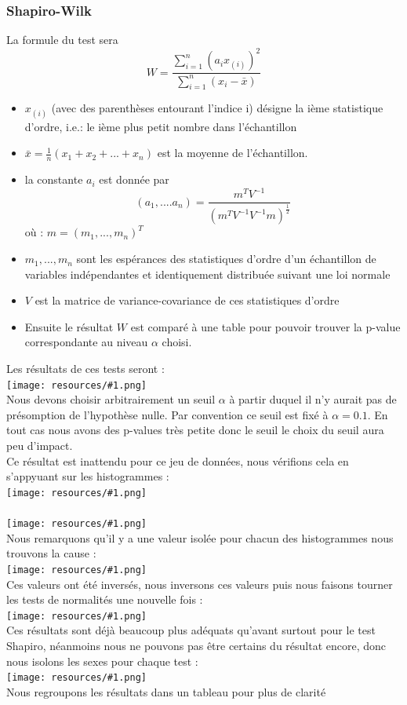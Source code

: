 \documentclass{report}
\newcommand{\photo}[1]{\\
    \texttt{[image: resources/\#1.png]}
\\
}
\begin{document}
\subsubsection{Shapiro-Wilk}
La formule du test sera
\begin{displaymath}
  W=\frac{\sum^{n}_{i=1}\left(a_ix_{(i)} \right)^2}
  {\sum^{n}_{i=1}\left(x_i-\bar{x}\right)}
\end{displaymath}
\begin{itemize}
  \item $x_{(i)}$ (avec des parenthèses entourant l'indice i) désigne la ième statistique d'ordre, i.e.: le ième plus petit nombre dans l'échantillon
  \item $\bar{x}=\frac{1}{n}(x_1+x_2+...+x_n)$ est la moyenne de l'échantillon.
  \item la constante $a_i$ est donnée par
  \begin{displaymath}
    (a_1,....a_n)=\frac{m^TV^{-1}}{(m^TV^{-1}V^{-1}m)^{\frac{1}{2}}}
  \end{displaymath}
  où : $m=(m_1,...,m_n)^T$
  \item $m_1,...,m_n$ sont les espérances des statistiques d'ordre d'un échantillon de variables indépendantes et identiquement distribuée suivant une loi normale
  \item $V$ est la matrice de variance-covariance de ces statistiques d'ordre
  \item Ensuite le résultat $W$ est comparé à une table pour
  pouvoir trouver la p-value correspondante au niveau $\alpha$ choisi.
\end{itemize}
Les résultats de ces tests seront :
\photo{20}
Nous devons choisir arbitrairement un seuil $\alpha$ à partir duquel
il n'y aurait pas de présomption de l'hypothèse nulle.
Par convention ce seuil est fixé à $\alpha=0.1$. En tout cas
nous avons des p-values très petite donc le seuil le choix
du seuil aura peu d'impact.\\
Ce résultat est inattendu pour ce jeu de données, nous
vérifions cela en s'appyuant sur les histogrammes :
\photo{21}
\photo{22}
Nous remarquons qu'il y a une valeur isolée pour chacun des
histogrammes nous trouvons la cause :
\photo{23}
Ces valeurs ont été inversés, nous inversons ces valeurs puis
nous faisons tourner les tests de normalités une nouvelle fois :
\photo{24}
Ces résultats sont déjà beaucoup plus adéquats qu'avant surtout
pour le test Shapiro, néanmoins nous ne pouvons pas être
certains du résultat encore, donc nous isolons les sexes
pour chaque test :
\photo{25}
Nous regroupons les résultats dans un tableau pour plus de clarité
\end{document}
